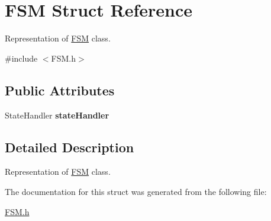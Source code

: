 \section{FSM Struct Reference}
\label{struct_f_s_m}


Representation of \hyperlink{struct_f_s_m}{FSM} class.  




{\ttfamily \#include $<$FSM.h$>$}

\subsection*{Public Attributes}
\begin{DoxyCompactItemize}
\item 
StateHandler {\bfseries stateHandler}\label{struct_f_s_m_aefab4097554c95dbed1b2820cf0cb9aa}

\end{DoxyCompactItemize}


\subsection{Detailed Description}
Representation of \hyperlink{struct_f_s_m}{FSM} class. 

The documentation for this struct was generated from the following file:\begin{DoxyCompactItemize}
\item 
\hyperlink{_f_s_m_8h}{FSM.h}\end{DoxyCompactItemize}
